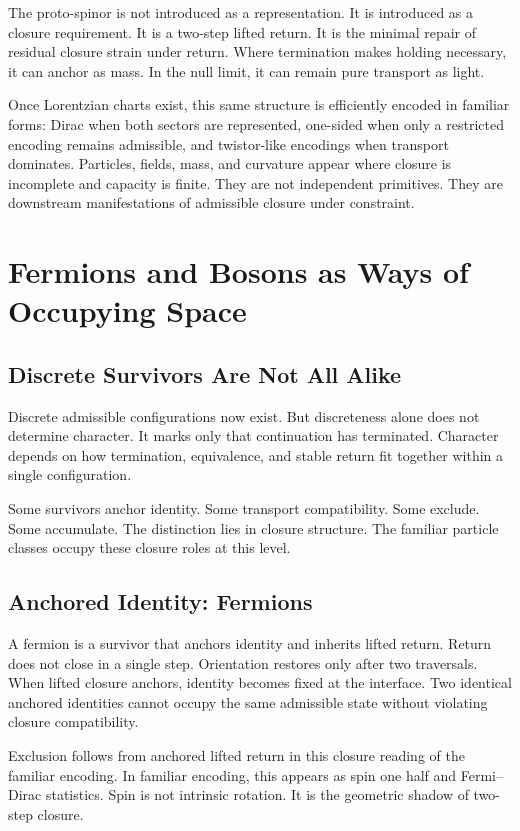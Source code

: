 \documentclass[11pt,twoside,openright]{book}
\begin{document}
The proto-spinor is not introduced as a representation. It is introduced as a closure requirement. It is a two-step lifted return. It is the minimal repair of residual closure strain under return. Where termination makes holding necessary, it can anchor as mass. In the null limit, it can remain pure transport as light.

Once Lorentzian charts exist, this same structure is efficiently encoded in familiar forms: Dirac when both sectors are represented, one-sided when only a restricted encoding remains admissible, and twistor-like encodings when transport dominates. Particles, fields, mass, and curvature appear where closure is incomplete and capacity is finite. They are not independent primitives. They are downstream manifestations of admissible closure under constraint.

\chapter{Fermions and Bosons as Ways of Occupying Space}

\section*{Discrete Survivors Are Not All Alike}

Discrete admissible configurations now exist. But discreteness alone does not determine character. It marks only that continuation has terminated. Character depends on how termination, equivalence, and stable return fit together within a single configuration.

Some survivors anchor identity. Some transport compatibility. Some exclude. Some accumulate. The distinction lies in closure structure. The familiar particle classes occupy these closure roles at this level.

\section*{Anchored Identity: Fermions}

A fermion is a survivor that anchors identity and inherits lifted return. Return does not close in a single step. Orientation restores only after two traversals. When lifted closure anchors, identity becomes fixed at the interface. Two identical anchored identities cannot occupy the same admissible state without violating closure compatibility.

Exclusion follows from anchored lifted return in this closure reading of the familiar encoding. In familiar encoding, this appears as spin one half and Fermi--Dirac statistics. Spin is not intrinsic rotation. It is the geometric shadow of two-step closure.
\end{document}
